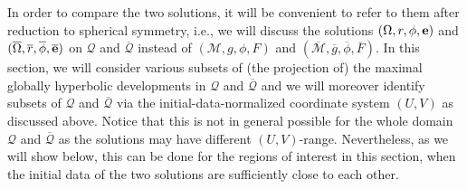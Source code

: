 \documentclass[10pt, reqno]{amsart}
\theoremstyle{definition}
\theoremstyle{remark}
\theoremstyle{conjecture}
\numberwithin{equation}{section}
\newcommand{\0}{\emptyset}
\newcommand{\Omg}{\Omega}
\newcommand{\bfe}{{\bf e}}
\newcommand{\calM}{\mathcal M}
\newcommand{\calQ}{\mathcal Q}
\newcommand{\e}{\bfe}							%
\newcommand{\gbg}{\overline{g}}					%
\newcommand{\Omgbg}{\overline{\Omg}}				%
\newcommand{\phibg}{\overline{\phi}}				%
\newcommand{\rbg}{\overline{r}}					%
\newcommand{\ebg}{\overline{\e}}					%
\begin{document}
In order to compare the two solutions, it will be convenient to refer to them after reduction to spherical symmetry, i.e., we will discuss the solutions $(\Omg, r, \phi, \e)$ and $(\Omgbg, \rbg, \phibg, \ebg)$ on $\calQ$ and $\overline{\calQ}$ instead of $(\calM, g, \phi, F)$ and $(\overline{\calM}, \gbg, \phibg, \overline{F})$. In this section, we will consider various subsets of (the projection of) the maximal globally hyperbolic developments in $\calQ$ and $\overline{\calQ}$ and we will moreover identify subsets of $\calQ$ and $\overline{\calQ}$ via the initial-data-normalized coordinate system $(U,V)$ as discussed above. Notice that this is not in general possible for the whole domain $\calQ$ and $\overline{\calQ}$ as the solutions may have different $(U,V)$-range. Nevertheless, as we will show below, this can be done for the regions of interest in this section, when the initial data of the two solutions are sufficiently close to each other. 
\end{document}
